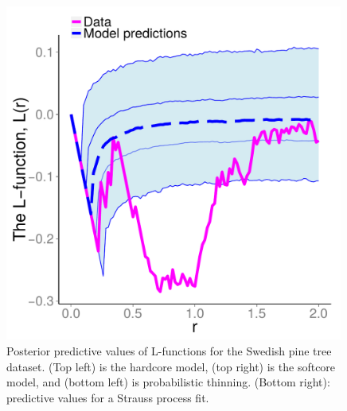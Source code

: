 \documentclass{statsoc}
\begin{document}
  \begin{figure}
  \begin{minipage}[h]{0.22\linewidth}
  \caption[Post Pred]{Posterior predictive values of L-functions for the Swedish pine tree dataset. (Top left) is the \matern hardcore model,
  (top right) is the softcore model, and (bottom left) is probabilistic thinning. (Bottom right): predictive values for a Strauss process fit.}
  \label{fig:swed_L_pred}
  \end{minipage}
  \ \ \ 
  \begin{minipage}[h]{0.6\linewidth}
  \begin{minipage}[h]{0.49\linewidth}
  \centering
  \includegraphics[width=0.99\textwidth]{figs/swed_hc_Lfunc.pdf}
  \end{minipage}
  \begin{minipage}[h]{0.49\linewidth}
  \centering

\end{minipage}
\end{minipage}
\end{figure}
\end{document}
